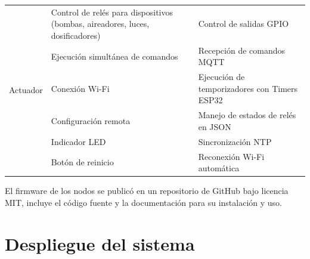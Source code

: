 \begin{table}[H]
\begin{tabular}{p{1.5cm}p{5.4cm}p{5.5cm}}
        \hline
        \multirow{7}{1.5cm}{Actuador}                     & Control de relés para dispositivos (bombas, aireadores, luces, dosificadores) & Control de salidas GPIO                        \\
                                                          & Ejecución simultánea de comandos                                              & Recepción de comandos MQTT                     \\
                                                          & Conexión Wi-Fi                                                                & Ejecución de temporizadores con Timers ESP32   \\
                                                          & Configuración remota                                                          & Manejo de estados de relés en JSON             \\
                                                          & Indicador LED                                                                 & Sincronización NTP                             \\
                                                          & Botón de reinicio                                                             & Reconexión Wi-Fi automática                    \\
        \hline
    \end{tabular}
    \label{tab:nodos_iot}
\end{table}



El firmware de los nodos se publicó en un repositorio de GitHub
\cite{GithubFirmware} bajo licencia MIT, incluye el código fuente y la
documentación para su instalación y uso.

\section{Despliegue del sistema}

